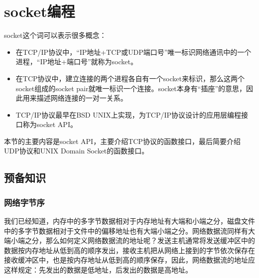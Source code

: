 

\chapter{socket编程}
%
socket这个词可以表示很多概念：


\begin{itemize}

\item 在TCP/\BookSplit{}IP协议中，“IP地址+TCP或UDP端口号”唯一标识网络通讯中的一个进程，“IP地址+端口号”就称为socket。

\item 在TCP协议中，建立连接的两个进程各自有一个socket来标识，那么这两个socket组成的socket pair就唯一标识一个连接。socket本身有“插座”的意思，因此用来描述网络连接的一对一关系。

\item TCP/\BookSplit{}IP协议最早在BSD UNIX上实现，为TCP/\BookSplit{}IP协议设计的应用层编程接口称为socket API。
\end{itemize}


本节的主要内容是socket API，主要介绍TCP协议的函数接口，最后简要介绍UDP协议和UNIX Domain Socket的函数接口。




\section{预备知识}
%
\subsection{网络字节序}
%


我们已经知道，内存中的多字节数据相对于内存地址有大端和小端之分，磁盘文件中的多字节数据相对于文件中的偏移地址也有大端小端之分。网络数据流同样有大端小端之分，那么如何定义网络数据流的地址呢？发送主机通常将发送缓冲区中的数据按内存地址从低到高的顺序发出，接收主机把从网络上接到的字节依次保存在接收缓冲区中，也是按内存地址从低到高的顺序保存，因此，网络数据流的地址应这样规定：先发出的数据是低地址，后发出的数据是高地址。



